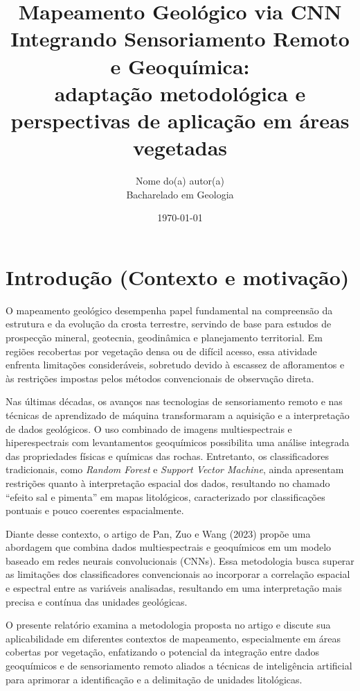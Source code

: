 \documentclass[12pt,a4paper]{article}
\title{Mapeamento Geológico via CNN Integrando Sensoriamento Remoto e Geoquímica: \\[2pt]
adaptação metodológica e perspectivas de aplicação em áreas vegetadas}
\author{Nome do(a) autor(a) \\ \small Bacharelado em Geologia}
\date{\today}
\begin{document}
\maketitle

\section{Introdução (Contexto e motivação)}
O mapeamento geológico desempenha papel fundamental na compreensão da estrutura e da evolução da crosta terrestre, servindo de base para estudos de prospecção mineral, geotecnia, geodinâmica e planejamento territorial. Em regiões recobertas por vegetação densa ou de difícil acesso, essa atividade enfrenta limitações consideráveis, sobretudo devido à escassez de afloramentos e às restrições impostas pelos métodos convencionais de observação direta.

Nas últimas décadas, os avanços nas tecnologias de sensoriamento remoto e nas técnicas de aprendizado de máquina transformaram a aquisição e a interpretação de dados geológicos. O uso combinado de imagens multiespectrais e hiperespectrais com levantamentos geoquímicos possibilita uma análise integrada das propriedades físicas e químicas das rochas. Entretanto, os classificadores tradicionais, como \emph{Random Forest} e \emph{Support Vector Machine}, ainda apresentam restrições quanto à interpretação espacial dos dados, resultando no chamado ``efeito sal e pimenta'' em mapas litológicos, caracterizado por classificações pontuais e pouco coerentes espacialmente.

Diante desse contexto, o artigo de Pan, Zuo e Wang (2023) propõe uma abordagem que combina dados multiespectrais e geoquímicos em um modelo baseado em redes neurais convolucionais (CNNs). Essa metodologia busca superar as limitações dos classificadores convencionais ao incorporar a correlação espacial e espectral entre as variáveis analisadas, resultando em uma interpretação mais precisa e contínua das unidades geológicas.

O presente relatório examina a metodologia proposta no artigo e discute sua aplicabilidade em diferentes contextos de mapeamento, especialmente em áreas cobertas por vegetação, enfatizando o potencial da integração entre dados geoquímicos e de sensoriamento remoto aliados a técnicas de inteligência artificial para aprimorar a identificação e a delimitação de unidades litológicas.

\end{document}

